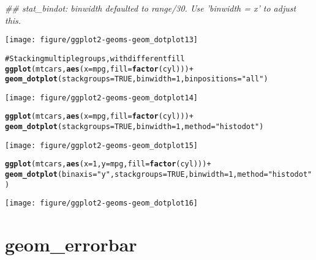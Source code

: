 \documentclass[a4paper,titlepage]{tufte-handout}\usepackage{graphicx, color}
\makeatletter
\def\maxwidth{ %
  \ifdim\Gin@nat@width>\linewidth
    \linewidth
  \else
    \Gin@nat@width
  \fi
}
\newcommand{\hlfunctioncall}[1]{\textcolor[rgb]{0.501960784313725,0,0.329411764705882}{\textbf{#1}}}%
\newcommand{\hlstring}[1]{\textcolor[rgb]{0.6,0.6,1}{#1}}%
\newcommand{\hlcomment}[1]{\textcolor[rgb]{0.180392156862745,0.6,0.341176470588235}{#1}}%
\newenvironment{kframe}{%
 \def\at@end@of@kframe{}%
 \ifinner\ifhmode%
  \def\at@end@of@kframe{\end{minipage}}%
  \begin{minipage}{\columnwidth}%
 \fi\fi%
 \def\FrameCommand##1{\hskip\@totalleftmargin \hskip-\fboxsep
 \colorbox{shadecolor}{##1}\hskip-\fboxsep
     \hskip-\linewidth \hskip-\@totalleftmargin \hskip\columnwidth}%
 \MakeFramed {\advance\hsize-\width
   \@totalleftmargin\z@ \linewidth\hsize
   \@setminipage}}%
 {\par\unskip\endMakeFramed%
 \at@end@of@kframe}
\newenvironment{knitrout}{}{} %
\makeatother
\begin{document}
\begin{knitrout}
\begin{kframe}
{\ttfamily\noindent\itshape\textcolor{messagecolor}{\#\# stat\_bindot: binwidth defaulted to range/30. Use 'binwidth = x' to adjust this.}}\end{kframe}\texttt{[image: figure/ggplot2-geoms-geom\_dotplot13]} \begin{kframe}\begin{alltt}
\hlcomment{# Stacking multiple groups, with different fill}
\hlfunctioncall{ggplot}(mtcars, \hlfunctioncall{aes}(x = mpg, fill = \hlfunctioncall{factor}(cyl))) +
  \hlfunctioncall{geom_dotplot}(stackgroups = TRUE, binwidth = 1, binpositions = \hlstring{"all"})
\end{alltt}
\end{kframe}\texttt{[image: figure/ggplot2-geoms-geom\_dotplot14]} \begin{kframe}\begin{alltt}
\hlfunctioncall{ggplot}(mtcars, \hlfunctioncall{aes}(x = mpg, fill = \hlfunctioncall{factor}(cyl))) +
  \hlfunctioncall{geom_dotplot}(stackgroups = TRUE, binwidth = 1, method = \hlstring{"histodot"})
\end{alltt}
\end{kframe}\texttt{[image: figure/ggplot2-geoms-geom\_dotplot15]} \begin{kframe}\begin{alltt}
\hlfunctioncall{ggplot}(mtcars, \hlfunctioncall{aes}(x = 1, y = mpg, fill = \hlfunctioncall{factor}(cyl))) +
  \hlfunctioncall{geom_dotplot}(binaxis = \hlstring{"y"}, stackgroups = TRUE, binwidth = 1, method = \hlstring{"histodot"})
\end{alltt}
\end{kframe}\texttt{[image: figure/ggplot2-geoms-geom\_dotplot16]} 
\end{knitrout}


\section{geom\_errorbar}
\end{document}
